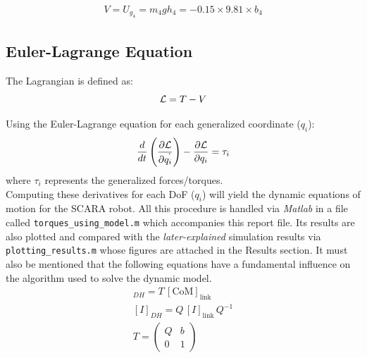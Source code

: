 \documentclass[conference]{IEEEtran}
\begin{document}
\begin{align}
    V = U_{g_4} = m_4 g h_4 = - 0.15 \times 9.81 \times b_4
\end{align}


\subsection{Euler-Lagrange Equation}
The Lagrangian is defined as:
\begin{equation} \Large
    \mathcal{L} = T - V
\end{equation}

Using the Euler-Lagrange equation for each generalized coordinate ($q_i$):
\begin{equation} \Large
    \frac{d}{dt} \left( \frac{\partial \mathcal{L}}{\partial \dot{q}_i} \right) - \frac{\partial \mathcal{L}}{\partial q_i} = \tau_i \label{eq:L}
\end{equation}
where $\tau_i$ represents the generalized forces/torques. \\

Computing these derivatives for each DoF ($q_i$) will yield the dynamic equations of motion for the SCARA robot. All this procedure is handled via \textit{Matlab} in a file called \texttt{torques\_using\_model.m} which accompanies this report file. Its results are also plotted and compared with the \textit{later-explained} simulation results via \texttt{plotting\_results.m} whose figures are attached in the Results section. It must also be mentioned that the following equations have a fundamental influence on the algorithm used to solve the dynamic model.
\begin{gather}
    [\mathrm{CoM}]_{DH}=T \, [\mathrm{CoM}]_{\text{link}} \\
    [I]_{DH}=Q \, [I]_{\text{link}} \, Q^{-1} \\
    T=\left(\begin{array}{ll}
            Q & b \\
            0 & 1
        \end{array}\right)
\end{gather}
\end{document}
